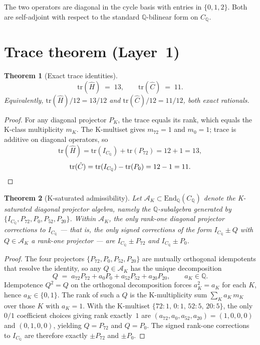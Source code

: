 \documentclass[11pt]{article}
\newtheorem{theorem}{Theorem}[section]
\newcommand{\CQ}{C_{\mathbb{Q}}}
\newcommand{\IC}{I_{\CQ}}
\newcommand{\PK}[1]{P_{#1}}
\newcommand{\Hop}{\hat H}
\newcommand{\Cop}{\hat C}
\begin{document}
The two operators are diagonal in the cycle basis with entries in
$\{0, 1, 2\}$. Both are self-adjoint with respect to the standard
$\mathbb{Q}$-bilinear form on $\CQ$.

\section{Trace theorem (Layer~1)}\label{sec:trace}

\begin{theorem}[Exact trace identities]\label{thm:trace}
\[
  \mathrm{tr}(\Hop) \;=\; 13, \qquad
  \mathrm{tr}(\Cop) \;=\; 11.
\]
Equivalently,
$\mathrm{tr}(\Hop)/12 = 13/12$ and $\mathrm{tr}(\Cop)/12 = 11/12$,
both exact rationals.
\end{theorem}

\begin{proof}
For any diagonal projector $\PK{K}$, the trace equals its rank, which
equals the K-class multiplicity $m_K$. The K-multiset gives
$m_{72} = 1$ and $m_{0} = 1$; trace is additive on diagonal operators,
so
\[
  \mathrm{tr}(\Hop) = \mathrm{tr}(\IC) + \mathrm{tr}(\PK{72}) = 12 + 1 = 13,
\]
\[
  \mathrm{tr}(\Cop) = \mathrm{tr}(\IC) - \mathrm{tr}(\PK{0}) = 12 - 1 = 11.\qedhere
\]
\end{proof}

\begin{theorem}[K-saturated admissibility]\label{thm:admissibility}
Let $\mathcal{A}_K \subset \mathrm{End}_{\mathbb{Q}}(\CQ)$ denote the
K-saturated diagonal projector algebra, namely the
$\mathbb{Q}$-subalgebra generated by
$\{\IC, \PK{72}, \PK{0}, \PK{52}, \PK{20}\}$.
Within $\mathcal{A}_K$, the only rank-one diagonal projector
corrections to $\IC$ --- that is, the only signed corrections of the
form $\IC \pm Q$ with $Q \in \mathcal{A}_K$ a rank-one projector ---
are $\IC \pm \PK{72}$ and $\IC \pm \PK{0}$.
\end{theorem}

\begin{proof}
The four projectors $\{\PK{72}, \PK{0}, \PK{52}, \PK{20}\}$ are
mutually orthogonal idempotents that resolve the identity, so any
$Q \in \mathcal{A}_K$ has the unique decomposition
\[
  Q \;=\; a_{72}\PK{72} + a_{0}\PK{0} + a_{52}\PK{52} + a_{20}\PK{20},
  \qquad a_K \in \mathbb{Q}.
\]
Idempotence $Q^2 = Q$ on the orthogonal decomposition forces
$a_K^2 = a_K$ for each $K$, hence $a_K \in \{0, 1\}$. The rank of
such a $Q$ is the K-multiplicity sum
$\sum_K a_K\,m_K$ over those $K$ with $a_K = 1$. With the K-multiset
$\{72{:}1,\,0{:}1,\,52{:}5,\,20{:}5\}$, the only $0/1$
coefficient choices giving rank exactly~$1$ are
$(a_{72}, a_0, a_{52}, a_{20}) = (1,0,0,0)$ and
$(0,1,0,0)$, yielding $Q = \PK{72}$ and $Q = \PK{0}$. The signed
rank-one corrections to $\IC$ are therefore exactly
$\pm \PK{72}$ and $\pm \PK{0}$.
\end{proof}
\end{document}
